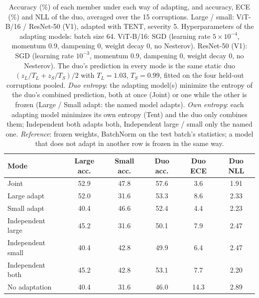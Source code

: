 \begin{table}[t]
    \centering
    \small
    \caption{Accuracy (\%) of each member under each way of adapting, and accuracy, ECE (\%) and NLL of the duo, averaged over the 15 corruptions. Large / small: ViT-B/16 / ResNet-50 (V1), adapted with TENT, severity 5. Hyperparameters of the adapting models: batch size 64. ViT-B/16: SGD (learning rate $5 \times 10^{-4}$, momentum 0.9, dampening 0, weight decay 0, no Nesterov). ResNet-50 (V1): SGD (learning rate $10^{-3}$, momentum 0.9, dampening 0, weight decay 0, no Nesterov). The duo's prediction in every mode is the same static duo $(z_L / T_L + z_S / T_S) / 2$ with $T_L = 1.03$, $T_S = 0.99$, fitted on the four held-out corruptions pooled. \emph{Duo entropy}: the adapting model(s) minimize the entropy of the duo's combined prediction, both at once (Joint) or one while the other is frozen (Large / Small adapt: the named model adapts). \emph{Own entropy}: each adapting model minimizes its own entropy (Tent) and the duo only combines them; Independent both adapts both, Independent large / small only the named one. \emph{Reference}: frozen weights, BatchNorm on the test batch's statistics; a model that does not adapt in another row is frozen in the same way.}
    \label{tab:adaptation_modes_summary:tent__vitb16_rn50v1_bn_lrL0p0005_S0p001_20261020-115851}
    \begin{tabular}{lccccc}
        \toprule
        Mode & Large acc. & Small acc. & Duo acc. & Duo ECE & Duo NLL \\
        \midrule
        Joint & 52.9 & 47.8 & 57.6 & 3.6 & 1.91 \\
        Large adapt & 52.0 & 31.6 & 53.3 & 8.6 & 2.33 \\
        Small adapt & 40.4 & 46.6 & 52.4 & 4.4 & 2.23 \\
        \midrule
        Independent large & 45.2 & 31.6 & 50.1 & 7.9 & 2.47 \\
        Independent small & 40.4 & 42.8 & 49.9 & 6.4 & 2.47 \\
        Independent both & 45.2 & 42.8 & 53.1 & 7.7 & 2.20 \\
        \midrule
        No adaptation & 40.4 & 31.6 & 46.0 & 14.3 & 2.89 \\
        \bottomrule
    \end{tabular}
\end{table}
